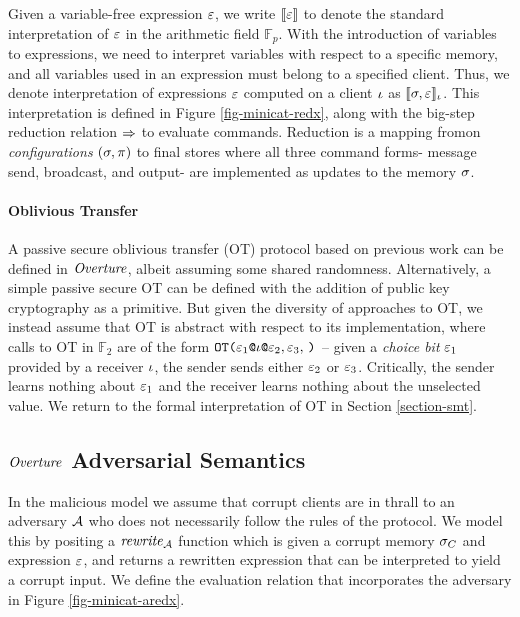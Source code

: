 Given a variable-free expression $\varepsilon$, we write $\llbracket \varepsilon \rrbracket$ to denote
the standard interpretation of $\varepsilon$ in the arithmetic field
$\mathbb{F}_{p}$. With the introduction of variables to expressions,
we need to interpret variables with respect to a specific memory, and
all variables used in an expression must belong to a specified client.
Thus, we denote interpretation of expressions $\varepsilon$ computed on a
client $\iota$ as $\llbracket \sigma,\varepsilon \rrbracket_{\iota}$. This interpretation is
defined in Figure \ref{fig-minicat-redx}, along with the big-step
reduction relation $\Rightarrow$ to evaluate commands. Reduction is a mapping
fromon \emph{configurations} $(\sigma,\pi)$ to final stores
where all three command forms- message send, broadcast, and
output- are implemented as updates to the memory $\sigma$. 


\paragraph{Oblivious Transfer} A passive secure oblivious transfer (OT) protocol
based on previous work \cite{barthe2019probabilistic} can be defined
in $\mathit{Overture}$, albeit assuming some shared randomness. Alternatively,
a simple passive secure OT can be defined with the addition of public
key cryptography as a primitive. But given the diversity of approaches
to OT, we instead assume that OT is abstract with respect to its
implementation, where calls to OT in $\mathbb{F}_2$ are of the form
$\OT{\elab{\be_1}{\cid}}{\be_2}{\be_3}$ -- given a \emph{choice bit}
$\varepsilon_1$ provided by a receiver $\iota$, the sender sends either $\varepsilon_2$
or $\varepsilon_3$.  Critically, the sender learns nothing about $\varepsilon_1$ and
the receiver learns nothing about the unselected value. We return to
the formal interpretation of OT in Section \ref{section-smt}.

\subsection{$\mathit{Overture}$ Adversarial Semantics}
  
\minicataredxfig

In the malicious model we assume that corrupt clients are in
thrall to an adversary $\mathcal{A}$ who does not necessarily follow
the rules of the protocol.  We model this by positing a $\mathit{rewrite}_{\mathcal{A}}$
function which is given a corrupt memory $\sigma_C$ and expression
$\varepsilon$, and returns a rewritten expression that can be interpreted to
yield a corrupt input. We define the evaluation relation that
incorporates the adversary in Figure \ref{fig-minicat-aredx}.

